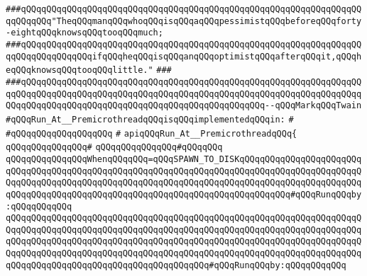 \newline
\newline
\newline
\verb|###qQQqqQQqqQQqqQQqqQQqqQQqqQQqqQQqqQQqqQQqqQQqqQQqqQQqqQQqqQQqqQQqqQQqqQQqqQQq"TheqQQqmanqQQqwhoqQQqisqQQqaqQQqpessimistqQQqbeforeqQQqforty-eightqQQqknowsqQQqtooqQQqmuch;|\newline
\verb|###qQQqqQQqqQQqqQQqqQQqqQQqqQQqqQQqqQQqqQQqqQQqqQQqqQQqqQQqqQQqqQQqqQQqqQQqqQQqqQQqqQQqifqQQqheqQQqisqQQqanqQQqoptimistqQQqafterqQQqit,qQQqheqQQqknowsqQQqtooqQQqlittle."|\newline
\verb|###|\newline
\verb|###qQQqqQQqqQQqqQQqqQQqqQQqqQQqqQQqqQQqqQQqqQQqqQQqqQQqqQQqqQQqqQQqqQQqqQQqqQQqqQQqqQQqqQQqqQQqqQQqqQQqqQQqqQQqqQQqqQQqqQQqqQQqqQQqqQQqqQQqqQQqqQQqqQQqqQQqqQQqqQQqqQQqqQQqqQQqqQQqqQQqqQQqqQQq--qQQqMarkqQQqTwain|\newline
\newline
\newline
\verb|#qQQqRun_At__PremicrothreadqQQqisqQQqimplementedqQQqin:|\newline
\verb|#|\newline
\verb|#qQQqqQQqqQQqqQQqqQQq|\newline
\verb|#|\newline
\verb|apiqQQqRun_At__PremicrothreadqQQq{|\newline
\verb|qQQqqQQqqQQqqQQq#|\newline
\verb|qQQqqQQqqQQqqQQq#qQQqqQQq|\newline
\verb|qQQqqQQqqQQqqQQqWhenqQQqqQQq=qQQqSPAWN_TO_DISKqQQqqQQqqQQqqQQqqQQqqQQqqQQqqQQqqQQqqQQqqQQqqQQqqQQqqQQqqQQqqQQqqQQqqQQqqQQqqQQqqQQqqQQqqQQqqQQqqQQqqQQqqQQqqQQqqQQqqQQqqQQqqQQqqQQqqQQqqQQqqQQqqQQqqQQqqQQqqQQqqQQqqQQqqQQqqQQqqQQqqQQqqQQqqQQqqQQqqQQqqQQqqQQqqQQqqQQqqQQq#qQQqRunqQQqby:qQQqqQQqqQQq|\newline
\verb|qQQqqQQqqQQqqQQqqQQqqQQqqQQqqQQqqQQqqQQqqQQqqQQqqQQqqQQqqQQqqQQqqQQqqQQqqQQqqQQqqQQqqQQqqQQqqQQqqQQqqQQqqQQqqQQqqQQqqQQqqQQqqQQqqQQqqQQqqQQqqQQqqQQqqQQqqQQqqQQqqQQqqQQqqQQqqQQqqQQqqQQqqQQqqQQqqQQqqQQqqQQqqQQqqQQqqQQqqQQqqQQqqQQqqQQqqQQqqQQqqQQqqQQqqQQqqQQqqQQqqQQqqQQqqQQqqQQqqQQqqQQqqQQqqQQqqQQqqQQqqQQqqQQqqQQqqQQqqQQq#qQQqRunqQQqby:qQQqqQQqqQQq|\newline

